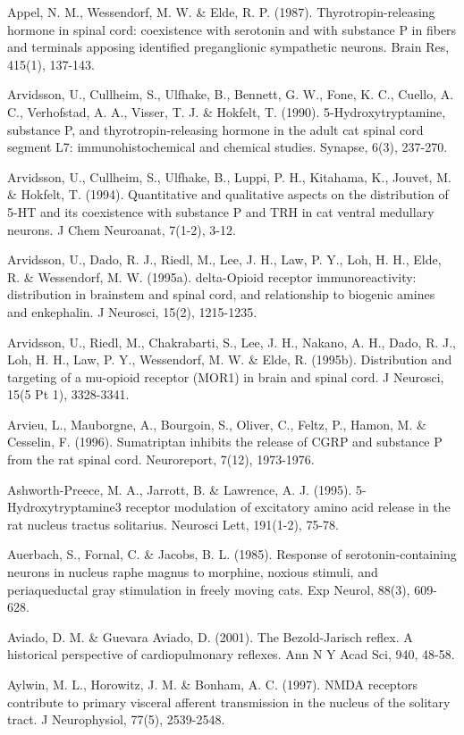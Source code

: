 \documentclass[a4paper,12pt,twoside]{report}
\begin{document}
\begin{singlespacing}
\begin{footnotesize}
Appel, N. M., Wessendorf, M. W. \& Elde, R. P. (1987). Thyrotropin-releasing hormone in spinal cord: coexistence with serotonin and with substance P in fibers and terminals apposing identified preganglionic sympathetic neurons. Brain Res, 415(1), 137-143.

Arvidsson, U., Cullheim, S., Ulfhake, B., Bennett, G. W., Fone, K. C., Cuello, A. C., Verhofstad, A. A., Visser, T. J. \& Hokfelt, T. (1990). 5-Hydroxytryptamine, substance P, and thyrotropin-releasing hormone in the adult cat spinal cord segment L7: immunohistochemical and chemical studies. Synapse, 6(3), 237-270.

Arvidsson, U., Cullheim, S., Ulfhake, B., Luppi, P. H., Kitahama, K., Jouvet, M. \& Hokfelt, T. (1994). Quantitative and qualitative aspects on the distribution of 5-HT and its coexistence with substance P and TRH in cat ventral medullary neurons. J Chem Neuroanat, 7(1-2), 3-12.

Arvidsson, U., Dado, R. J., Riedl, M., Lee, J. H., Law, P. Y., Loh, H. H., Elde, R. \& Wessendorf, M. W. (1995a). delta-Opioid receptor immunoreactivity: distribution in brainstem and spinal cord, and relationship to biogenic amines and enkephalin. J Neurosci, 15(2), 1215-1235.

Arvidsson, U., Riedl, M., Chakrabarti, S., Lee, J. H., Nakano, A. H., Dado, R. J., Loh, H. H., Law, P. Y., Wessendorf, M. W. \& Elde, R. (1995b). Distribution and targeting of a mu-opioid receptor (MOR1) in brain and spinal cord. J Neurosci, 15(5 Pt 1), 3328-3341.

Arvieu, L., Mauborgne, A., Bourgoin, S., Oliver, C., Feltz, P., Hamon, M. \& Cesselin, F. (1996). Sumatriptan inhibits the release of CGRP and substance P from the rat spinal cord. Neuroreport, 7(12), 1973-1976.

Ashworth-Preece, M. A., Jarrott, B. \& Lawrence, A. J. (1995). 5-Hydroxytryptamine3 receptor modulation of excitatory amino acid release in the rat nucleus tractus solitarius. Neurosci Lett, 191(1-2), 75-78.

Auerbach, S., Fornal, C. \& Jacobs, B. L. (1985). Response of serotonin-containing neurons in nucleus raphe magnus to morphine, noxious stimuli, and periaqueductal gray stimulation in freely moving cats. Exp Neurol, 88(3), 609-628.

Aviado, D. M. \& Guevara Aviado, D. (2001). The Bezold-Jarisch reflex. A historical perspective of cardiopulmonary reflexes. Ann N Y Acad Sci, 940, 48-58.

Aylwin, M. L., Horowitz, J. M. \& Bonham, A. C. (1997). NMDA receptors contribute to primary visceral afferent transmission in the nucleus of the solitary tract. J Neurophysiol, 77(5), 2539-2548.


\end{footnotesize}
\end{singlespacing}
\end{document}
